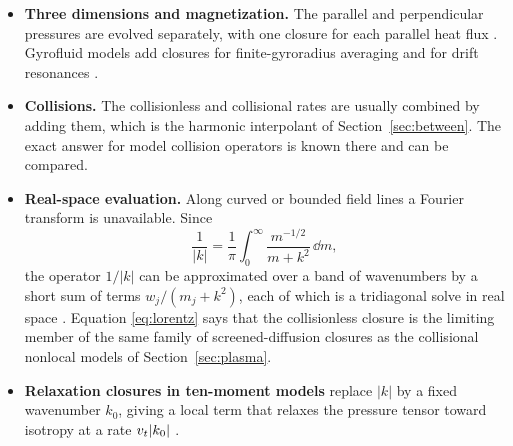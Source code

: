 \begin{itemize}
  \item \textbf{Three dimensions and magnetization.} The parallel and
    perpendicular pressures are evolved separately, with one closure for
    each parallel heat flux \cite{Snyder97}. Gyrofluid models add closures
    for finite-gyroradius averaging and for drift resonances
    \cite{DorlandHammett93}.
  \item \textbf{Collisions.} The collisionless and collisional rates are
    usually combined by adding them, which is the harmonic interpolant of
    Section~\ref{sec:between}. The exact answer for model collision
    operators is known there and can be compared.
  \item \textbf{Real-space evaluation.} Along curved or bounded field lines
    a Fourier transform is unavailable. Since
    \begin{equation}
      \frac1{|k|}=\frac1\pi\int_0^\infty\frac{m^{-1/2}}{m+k^2}\,\dd m,
      \label{eq:lorentz}
    \end{equation}
    the operator $1/|k|$ can be approximated over a band of wavenumbers by
    a short sum of terms $w_j/(m_j+k^2)$, each of which is a tridiagonal
    solve in real space \cite{DJU14}. Equation \eqref{eq:lorentz} says that
    the collisionless closure is the limiting member of the same family of
    screened-diffusion closures as the collisional nonlocal models of
    Section~\ref{sec:plasma}.
  \item \textbf{Relaxation closures in ten-moment models} replace
    $|k|$ by a fixed wavenumber $k_0$, giving a local term that relaxes the
    pressure tensor toward isotropy at a rate $v_t|k_0|$ \cite{Wang15}.
\end{itemize}
